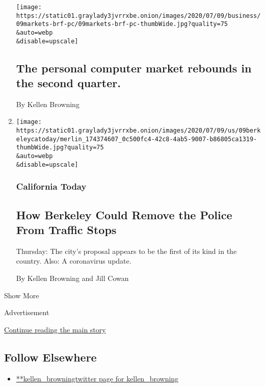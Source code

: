 \begin{enumerate}
  \texttt{[image: https://static01.graylady3jvrrxbe.onion/images/2020/07/09/business/09markets-brf-pc/09markets-brf-pc-thumbWide.jpg?quality=75\\\&auto=webp\\\&disable=upscale]}

  \hypertarget{the-personal-computer-market-rebounds-in-the-second-quarter}{%
  \subsection{The personal computer market rebounds in the second
  quarter.}\label{the-personal-computer-market-rebounds-in-the-second-quarter}}

  By Kellen Browning
\item
  \href{/2020/07/09/us/berkeley-ca-police-department-reform.html}{}

  \texttt{[image: https://static01.graylady3jvrrxbe.onion/images/2020/07/09/us/09berkeleycatoday/merlin\_174374607\_0c500fc4-42c8-4ab5-9007-b86805ca1319-thumbWide.jpg?quality=75\\\&auto=webp\\\&disable=upscale]}

  \hypertarget{california-today-1}{%
  \subsubsection{California Today}\label{california-today-1}}

  \hypertarget{how-berkeley-could-remove-the-police-from-traffic-stops}{%
  \subsection{How Berkeley Could Remove the Police From Traffic
  Stops}\label{how-berkeley-could-remove-the-police-from-traffic-stops}}

  Thursday: The city's proposal appears to be the first of its kind in
  the country. Also: A coronavirus update.

  By Kellen Browning and Jill Cowan
\end{enumerate}

Show More

Advertisement

\protect\hyperlink{after-mid2}{Continue reading the main story}

\hypertarget{follow-elsewhere}{%
\subsection{Follow Elsewhere}\label{follow-elsewhere}}

\begin{itemize}
\tightlist
\item
  \href{https://twitter.com/kellen_browning}{**kellen\_browningtwitter
  page for kellen\_browning}
\end{itemize}

